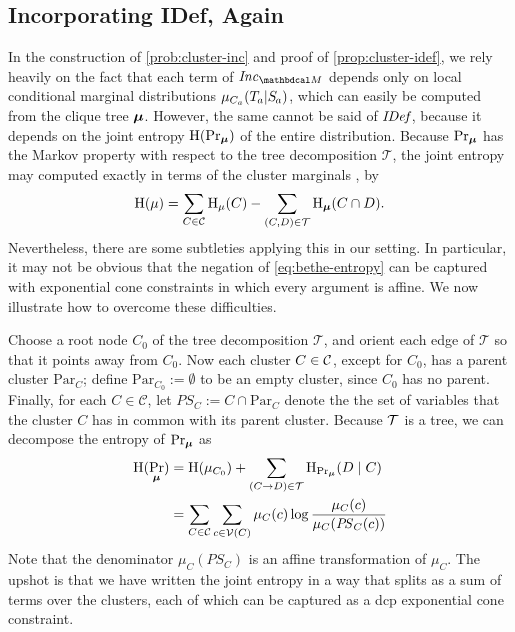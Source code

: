 \documentclass[twoside]{article}
\begin{document}
\subsection{Incorporating IDef, Again}
%
In the construction of \eqref{prob:cluster-inc}
and proof of \cref{prop:cluster-idef}, we rely
heavily on the fact that 
each term 
of $\Inc_{\dg M}$
depends only on local conditional marginal distributions $\mu_{C_a}(\Tgt a | \Src a)$,
which can easily be computed from the clique tree $\boldsymbol\mu$.
However, the same cannot be said of $\mathit{IDef}_{\!}$, because it depends on the joint entropy $\operatorname{\mathrm{H}}(\Pr_{\boldsymbol\mu})$ of the entire distribution.
Because $\Pr_{\boldsymbol\mu}$ has the Markov property with respect to
the tree decomposition $\mathcal T$, 
the joint entropy may computed exactly in terms of the cluster marginals \parencite{wainwright2008graphical}, by
\begin{equation}\label{eq:bethe-entropy}
    \operatorname{\mathrm{H}}(\mu) 
        = \sum_{C \in \mathcal C} \operatorname{\mathrm{H}}_\mu(C) 
        - \sum_{(C,D) \in \mathcal T} \operatorname{\mathrm{H}}_{\boldsymbol\mu}(C \cap D).
\end{equation}
Nevertheless, there are some subtleties applying this in our setting.
In particular, it may not be obvious that the negation of \eqref{eq:bethe-entropy} can be 
captured with exponential cone constraints in which every argument is affine. 
We now illustrate how to overcome these difficulties.

\def\Par{\mathrm{Par}}
\def\Pash{\mathit{P\!S}}

Choose a root node $C_0$ of the tree decomposition $\mathcal T$, and orient each edge of $\mathcal T$ so that it points away from $C_0$. 
Now each cluster $C \in \cal C$, except for $C_0$, has a parent cluster $\Par_C$;
define $\Par_{C_0} := \emptyset$ to be an empty cluster, since $C_0$ has no parent. 
Finally, for each $C \in \mathcal C$, let $\Pash_C := C \cap \Par_C$ denote the
the set of variables that the cluster $C$ has in common with its parent cluster.
Because $\cal T$ is a tree, we can decompose the entropy of $\Pr_{\boldsymbol\mu}$ as 
%
\begin{align*}
    \H(\Pr_{\bmu}) &= 
        \H(\mu_{C_0}) + 
        \sum_{(C \to D) \in \mathcal T}
        \H_{\Pr_{\bmu}}(D \mid C)\\
    &= \sum_{C \in \cal C} 
        \sum_{c \in \V(C)} \mu_C(c) \log \frac
            {\mu_C(c)}{\mu_C( \Pash_C(c) )}
\end{align*}
%
Note that the denominator $\mu_C(\Pash_C)$ is an affine transformation of $\mu_C$.
The upshot is that we have written the joint entropy in a way that 
splits as a sum of terms over the clusters, each of which can be captured as a dcp exponential cone constraint. 
\end{document}
